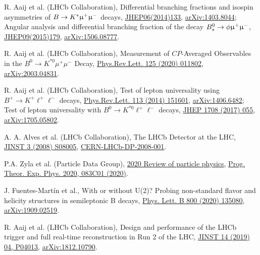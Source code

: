 \documentclass[a4paper,11pt]{article}
\begin{document}
\begin{thebibliography}{99}

R. Aaij et al. (LHCb Collaboration),
Differential branching fractions and isospin asymmetries of ${B}\to {\ensuremath{{{K}}^{*}}}{\ensuremath{\upmu^+}}{\ensuremath{\upmu^-}}$ decays, 
\href{https://doi.org/10.1007/JHEP06(2014)133}{JHEP06(2014)133},
\href{http://arxiv.org/abs/arXiv:1403.8044}{arXiv:1403.8044};
Angular analysis and differential branching fraction of the decay ${{B}^0_{{s}}}\to \phi{\ensuremath{\upmu^+}}{\ensuremath{\upmu^-}}$, 
\href{https://doi.org/10.1007/JHEP09(2015)179}{JHEP09(2015)179},
\href{http://arxiv.org/abs/arXiv:1506.08777}{arXiv:1506.08777}.

R. Aaij et al. (LHCb Collaboration),
Measurement of $CP$-Averaged Observables in the $B^{0}\rightarrow K^{*0}\mu^{+}\mu^{-}$ Decay,
\href{https://doi.org/10.1103/PhysRevLett.125.011802}{Phys.Rev.Lett. 125 (2020) 011802},
\href{http://arxiv.org/abs/arXiv:2003.04831}{arXiv:2003.04831}.

R. Aaij et al. (LHCb Collaboration),
Test of lepton universality using $B^{+}\rightarrow K^{+}\ell^{+}\ell^{-}$ decays,
\href{https://doi.org/10.1103/PhysRevLett.113.151601}{Phys.Rev.Lett. 113 (2014) 151601},
\href{http://arxiv.org/abs/arXiv:1406.6482}{arXiv:1406.6482};
Test of lepton universality with $B^{0} \rightarrow K^{*0}\ell^{+}\ell^{-}$ decays,
\href{https://doi.org/10.1007/JHEP08(2017)055}{JHEP 1708 (2017) 055},
\href{http://arxiv.org/abs/arXiv:1705.05802}{arXiv:1705.05802}.

A. A. Alves et al. (LHCb Collaboration),
The LHCb Detector at the LHC,
\href{https://doi.org/10.1088/1748-0221/3/08/S08005}{JINST 3 (2008) S08005},
\href{http://cds.cern.ch/record/1129809}{CERN-LHCb-DP-2008-001}.

P.A. Zyla et al. (Particle Data Group),
{\href{http://pdg.lbl.gov/}{2020 Review of particle physics}},
\href{https://academic.oup.com/ptep/article/2020/8/083C01/5891211}{Prog. Theor. Exp. Phys. 2020, 083C01 (2020)}.

J. Fuentes-Mart\'in et al.,
With or without U(2)? Probing non-standard flavor and helicity structures in semileptonic B decays,
\href{https://doi.org/10.1016/j.physletb.2019.135080}{Phys. Lett. B 800 (2020) 135080},
\href{http://arxiv.org/abs/arXiv:1909.02519}{arXiv:1909.02519}.

R. Aaij et al. (LHCb Collaboration),
Design and performance of the LHCb trigger and full real-time reconstruction in Run 2 of the LHC,
\href{https://doi.org/10.1088/1748-0221/14/04/P04013}{JINST 14 (2019) 04, P04013},
\href{http://arxiv.org/abs/arXiv:1812.10790}{arXiv:1812.10790}.


\end{thebibliography}
\end{document}
